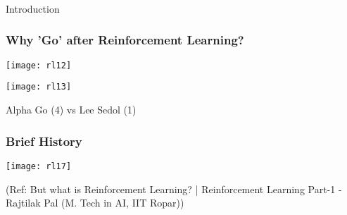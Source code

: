 \begin{frame}[fragile]\frametitle{}
\begin{center}
{\Large Introduction}
\end{center}
\end{frame}


\begin{frame}[fragile]\frametitle{Why 'Go' after Reinforcement Learning?}

\begin{center}
\texttt{[image: rl12]}

\texttt{[image: rl13]}

Alpha Go (4) vs Lee Sedol (1)
\end{center}

\end{frame}

\begin{frame}[fragile]\frametitle{Brief History}

\begin{center}
\texttt{[image: rl17]}
\end{center}

{\tiny (Ref: But what is Reinforcement Learning? | Reinforcement Learning Part-1 - Rajtilak Pal (M. Tech in AI, IIT Ropar))}
\end{frame}

